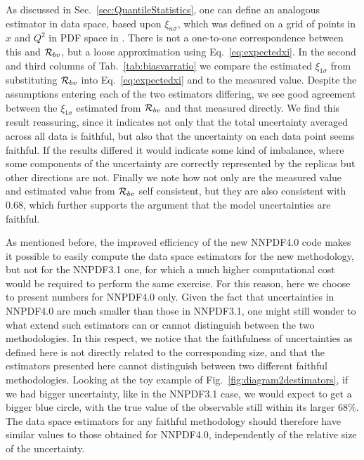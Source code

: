 As discussed in Sec.~\ref{sec:QuantileStatistics}, one can define an analogous
estimator in data space, based upon $\xi_{n\sigma}$, which was defined on a grid
of points in $x$ and $Q^2$ in PDF space in \cite{nnpdf30}. There is not a
one-to-one correspondence between this and $\mathcal{R}_{bv}$, but a loose
approximation using Eq.~\ref{eq:expectedxi}. In the second and third columns of
Tab.~\ref{tab:biasvarratio} we compare the estimated $\xi_{1\sigma}$ from
substituting $\mathcal{R}_{bv}$ into Eq.~\ref{eq:expectedxi} and to the measured
value. Despite the assumptions entering each of the two estimators differing, we
see good agreement between the $\xi_{1\sigma}$ estimated from $\mathcal{R}_{bv}$
and that measured directly. We find this result reassuring, since it indicates
not only that the total uncertainty averaged across all data is faithful, but
also that the uncertainty on each data point seems faithful. If the results
differed it would indicate some kind of imbalance, where some components of the
uncertainty are correctly represented by the replicas but other directions are
not. Finally we note how not only are the measured value and estimated value
from $\mathcal{R}_{bv}$ self consistent, but they are also consistent with $0.68$,
which further supports the argument that the model uncertainties are faithful.

%
As mentioned before, the improved efficiency of the new NNPDF4.0 code
makes it possible to easily compute the data space estimators for the new methodology,
but not for the NNPDF3.1 one, for which a much higher computational cost would be required to perform
the same exercise. For this reason, here we choose to present numbers for NNPDF4.0 only.
Given the fact that uncertainties in NNPDF4.0 are much smaller than those in NNPDF3.1,
one might still wonder to what extend such estimators can or cannot distinguish between
the two methodologies. In this respect, we notice that the faithfulness of uncertainties as defined here
is not directly related to the corresponding size, and that the estimators presented here
cannot distinguish between two different faithful methodologies. 
Looking at the toy example of Fig.~\ref{fig:diagram2destimators}, if we had bigger uncertainty, like 
in the NNPDF3.1 case, we would expect to get a bigger blue circle, with the true value of the observable
still within its larger $68\%$. The data space estimators for any faithful methodology
should therefore have similar values to those obtained for NNPDF4.0, independently of the
relative size of the uncertainty.





